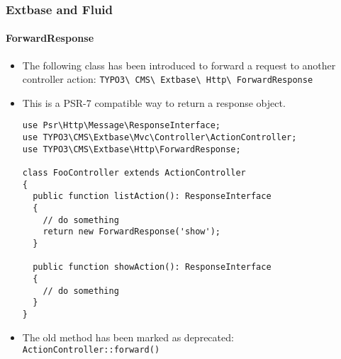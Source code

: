 %

\begin{frame}[fragile]
	\frametitle{Extbase and Fluid}
	\framesubtitle{ForwardResponse}


	\begin{itemize}
		\item The following class has been introduced to forward a request to
			another controller action:
			\small\texttt{TYPO3\textbackslash
				CMS\textbackslash
				Extbase\textbackslash
				Http\textbackslash
				ForwardResponse}\normalsize
		\item This is a PSR-7 compatible way to return a response object.
\begin{lstlisting}
use Psr\Http\Message\ResponseInterface;
use TYPO3\CMS\Extbase\Mvc\Controller\ActionController;
use TYPO3\CMS\Extbase\Http\ForwardResponse;

class FooController extends ActionController
{
  public function listAction(): ResponseInterface
  {
    // do something
    return new ForwardResponse('show');
  }

  public function showAction(): ResponseInterface
  {
    // do something
  }
}
\end{lstlisting}

		\item The old method has been marked as deprecated:\newline
			\small\texttt{ActionController::forward()}\normalsize

	\end{itemize}

\end{frame}

